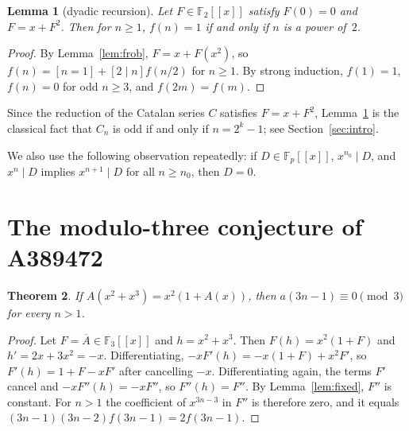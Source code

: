 \documentclass[11pt]{article}
\newtheorem{theorem}{Theorem}
\newtheorem{lemma}[theorem]{Lemma}
\theoremstyle{remark}
\newcommand{\F}{\mathbb F}
\begin{document}
\begin{lemma}[dyadic recursion]\label{lem:dyadic}
Let $F\in\F_2[[x]]$ satisfy $F(0)=0$ and $F=x+F^2$. Then for $n\ge1$,
$f(n)=1$ if and only if $n$ is a power of~$2$.
\end{lemma}
\begin{proof}
By Lemma~\ref{lem:frob}, $F=x+F(x^2)$, so $f(n)=[n=1]+[2\mid n]f(n/2)$ for
$n\ge1$. By strong induction, $f(1)=1$, $f(n)=0$ for odd $n\ge3$, and
$f(2m)=f(m)$.
\end{proof}

Since the reduction of the Catalan series $C$ satisfies $F=x+F^2$,
Lemma~\ref{lem:dyadic} is the classical fact that $C_n$ is odd if and only if
$n=2^k-1$; see Section~\ref{sec:intro}.

We also use the following observation repeatedly: if $D\in\F_p[[x]]$,
$x^{n_0}\mid D$, and $x^n\mid D$ implies $x^{n+1}\mid D$ for all $n\ge n_0$,
then $D=0$.

\section{The modulo-three conjecture of A389472}
\begin{theorem}\label{thm:389472}
If $A(x^2+x^3)=x^2(1+A(x))$, then $a(3n-1)\equiv0\pmod3$ for every $n>1$.
\end{theorem}
\begin{proof}
Let $F=\overline A\in\F_3[[x]]$ and $h=x^2+x^3$. Then $F(h)=x^2(1+F)$ and
$h'=2x+3x^2=-x$. Differentiating, $-xF'(h)=-x(1+F)+x^2F'$, so
$F'(h)=1+F-xF'$ after cancelling $-x$. Differentiating again, the terms $F'$
cancel and $-xF''(h)=-xF''$, so $F''(h)=F''$. By Lemma~\ref{lem:fixed},
$F''$ is constant. For $n>1$ the coefficient of $x^{3n-3}$ in $F''$ is
therefore zero, and it equals $(3n-1)(3n-2)f(3n-1)=2f(3n-1)$.
\end{proof}
\end{document}
